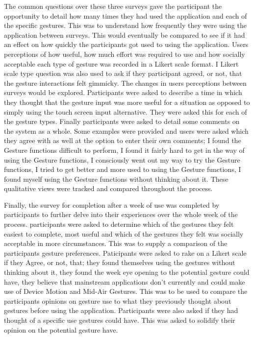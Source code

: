 \documentclass{l4proj}
\begin{document}
The common questions over these three surveys gave the participant the opportunity to detail how many times they had used the application and each of the specific gestures. This was to understand how frequently they were using the application between surveys. This would eventually be compared to see if it had an effect on how quickly the participants got used to using the application. Users perceptions of how useful, how much effort was required to use and how socially acceptable each type of gesture was recorded in a Likert scale format. I Likert scale type question was also used to ask if they participant agreed, or not, that the gesture interactions felt gimmicky. The changes in users perceptions between surveys would be explored. Participants were asked to describe a time in which they thought that the gesture input was more useful for a situation as opposed to simply using the touch screen input alternative. They were asked this for each of the gesture types. Finally participants were asked to detail some comments on the system as a whole. Some examples were provided and users were asked which they agree with as well at the option to enter their own comments; I found the Gesture functions difficult to perform, I found it fairly hard to get in the way of using the Gesture functions, I consciously went out my way to try the Gesture functions, I tried to get better and more used to using the Gesture functions, I found myself using the Gesture functions without thinking about it. These qualitative views were tracked and compared throughout the process.

Finally, the survey for completion after a week of use was completed by participants to further delve into their experiences over the whole week of the process. participants were asked to determine which of the gestures they felt easiest to complete, most useful and which of the gestures they felt was socially acceptable in more circumstances. This was to supply a comparison of the participants gesture preferences. Paticipants were asked to rake on a Likert scale if they Agree, or not, that; they found themselves using the gestures without thinking about it, they  found the week eye opening to the potential gesture could have, they believe that mainstream applications don't currently and could make use of Device Motion and Mid-Air Gestures. This was to be used to compare the participants opinions on gesture use to what they previously thought about gestures before using the application. Participants were also asked if they had thought of a specific use gestures could have. This was asked to solidify their opinion on the potential gesture have.
\end{document}

